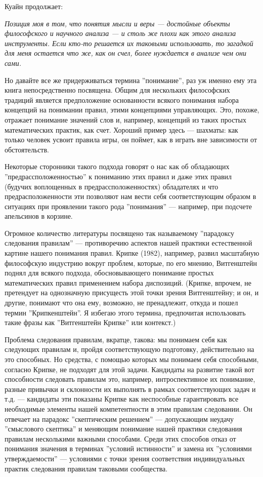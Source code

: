 \documentclass[11pt]{book}
\begin{document}
\smallskip

Куайн продолжает:

\smallskip

\textit{Позиция моя в том, что понятия мысли и веры --- достойные объекты философского и научного анализа --- и столь же плохи как этого анализа инструменты. Если кто-то решается их таковыми использовать, то загадкой для меня остается что же, как он счел, более нуждается в анализе чем они сами.}

\smallskip

Но давайте все же придерживаться термина ''понимание'', раз уж именно ему эта книга непосредственно посвящена. Общим для нескольких философских традиций является предположение основанности всякого понимания набора концепций на понимании правил, этими концепциями управляющих. Это, похоже, отражает понимание значений слов и, например, концепций из таких простых математических практик, как счет. Хороший пример здесь --- шахматы: как только человек усвоит правила игры, он поймет, как в играть вне зависимости от обстоятельств.

Некоторые сторонники такого подхода говорят о нас как об обладающих ''предрассположенностью'' к пониманию этих правил и даже этих правил (будучих воплощенных в предрассположенностях) обладателях и что предрасположенности эти позволяют нам вести себя соответствующим образом в ситуациях при проявлении такого рода ''понимания'' --- например, при подсчете апельсинов в корзине.

Огромное количество литературы посвящено так называемому ''парадоксу следования правилам'' --- противоречию аспектов нашей практики естественной картине нашего понимания правил. Крипке (1982), например, развил масштабную философскую индустрию вокруг проблем, которые, по его мнению, Витгенштейн поднял для всякого подхода, обосновывающего понимание простых математических правил применением набора диспозиций. (Крипке, впрочем, не претендует на однозначную присущесть этой точки зрения Витгенштейну; и он, и другие, понимают что она ему, возможно, не пренадлежит, откуда и пошел термин ''Крипкенштейн''. Я избегаю этого термина, предпочитая использовать такие фразы как ''Витгенштейн Крипке'' или контекст.)

Проблема следования правилам, вкратце, такова: мы понимаем себя как следующих правилам и, пройдя соответствующую подготовку, действительно на это способных. Но средства, с помощью которых мы понимаем себя способными, согласно Крипке, не подходят для этой задачи. Кандидаты на развитие такой вот способности следовать правилам это, например, интроспективное их понимание, разные привычки и склонности их выполнять в рамках соответствующих задач и т.д. --- кандидаты эти показаны Крипке как неспособные гарантировать все необходимые элементы нашей компетентности в этим правилам следовании. Он отвечает на парадокс ''скептическим решением'' --- допускающим неудачу ''смыслового скептика'' и меняющим понимание нашей практики следования правилам несколькими важными способами. Среди этих способов отказ от понимания значения в терминах ''условий истинности'' и замена их ''условиями утверждаемости'' --- условиями с точки зрения соответствия индивидуальных практик следования правилам таковыми сообщества.
\end{document}
